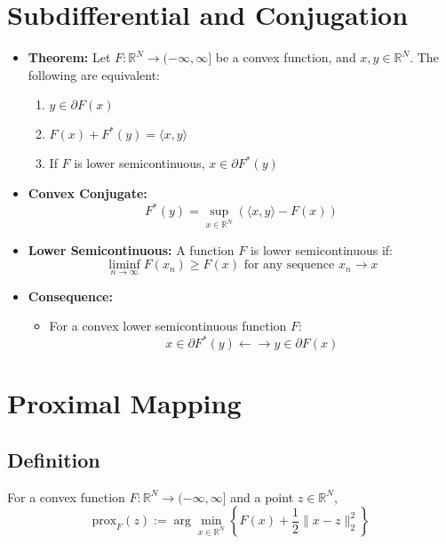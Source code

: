 \documentclass{article}
\begin{document}
\section*{Subdifferential and Conjugation}

\begin{itemize}
    \item \textbf{Theorem:} Let $F : \mathbb{R}^N \rightarrow (-\infty, \infty]$ be a convex function, and $x, y \in \mathbb{R}^N$. The following are equivalent:
    \begin{enumerate}[]
        \item $y \in \partial F(x)$
        \item $F(x) + F^*(y) = \langle x, y \rangle$
        \item If $F$ is lower semicontinuous, $x \in \partial F^*(y)$
    \end{enumerate}
    
    \item \textbf{Convex Conjugate:}
    \[
    F^*(y) = \sup_{x \in \mathbb{R}^N} \left( \langle x, y \rangle - F(x) \right)
    \]
    
    \item \textbf{Lower Semicontinuous:} A function $F$ is lower semicontinuous if:
    \[
    \liminf_{n \to \infty} F(x_n) \geq F(x) \text{ for any sequence } x_n \to x
    \]
    
    \item \textbf{Consequence:}
    \begin{itemize}
        \item For a convex lower semicontinuous function $F$:
        \[
        x \in \partial F^*(y) \leftarrow \rightarrow y \in \partial F(x)
        \]
    \end{itemize}
\end{itemize}














\section*{Proximal Mapping}

\subsection*{Definition}
For a convex function $F : \mathbb{R}^N \rightarrow (-\infty,\infty]$ and a point $z \in \mathbb{R}^N$, 
\[
\text{prox}_F(z) := \arg \min_{x \in \mathbb{R}^N} \left\{ F(x) + \frac{1}{2} \| x - z \|_2^2 \right\}
\]
\end{document}
